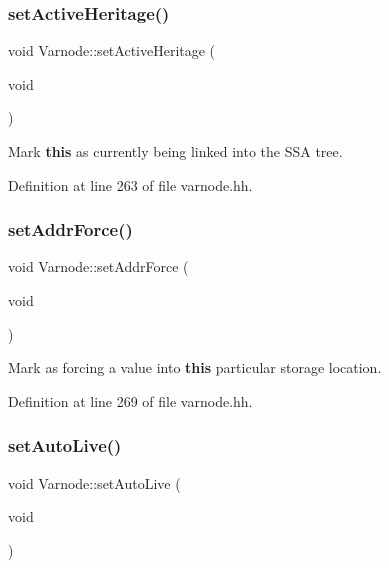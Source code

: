 \subsubsection{\texorpdfstring{setActiveHeritage()}{setActiveHeritage()}}
{\footnotesize\ttfamily void Varnode\+::set\+Active\+Heritage (\begin{DoxyParamCaption}\item[{void}]{ }\end{DoxyParamCaption})\hspace{0.3cm}{\ttfamily [inline]}}



Mark {\bfseries{this}} as currently being linked into the S\+SA tree. 



Definition at line 263 of file varnode.\+hh.

\mbox{\label{class_varnode_a0117b1856bd2977cd1eed1dd8df2dcce}} 
\subsubsection{\texorpdfstring{setAddrForce()}{setAddrForce()}}
{\footnotesize\ttfamily void Varnode\+::set\+Addr\+Force (\begin{DoxyParamCaption}\item[{void}]{ }\end{DoxyParamCaption})\hspace{0.3cm}{\ttfamily [inline]}}



Mark as forcing a value into {\bfseries{this}} particular storage location. 



Definition at line 269 of file varnode.\+hh.

\mbox{\label{class_varnode_acf647baf25ce17b30ab31be68208a23f}} 
\subsubsection{\texorpdfstring{setAutoLive()}{setAutoLive()}}
{\footnotesize\ttfamily void Varnode\+::set\+Auto\+Live (\begin{DoxyParamCaption}\item[{void}]{ }\end{DoxyParamCaption})\hspace{0.3cm}{\ttfamily [inline]}}



